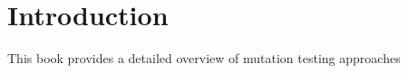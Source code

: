 
\chapter*{Introduction}
\label{sec:introduction}


This book provides a detailed overview of mutation testing approaches